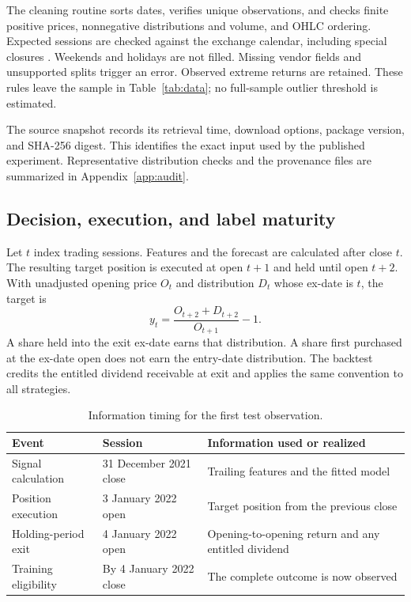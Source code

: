 The cleaning routine sorts dates, verifies unique observations, and checks finite positive prices, nonnegative distributions and volume, and OHLC ordering. Expected sessions are checked against the exchange calendar, including special closures \citep{exchangecalendars}. Weekends and holidays are not filled. Missing vendor fields and unsupported splits trigger an error. Observed extreme returns are retained. These rules leave the sample in Table~\ref{tab:data}; no full-sample outlier threshold is estimated.

The source snapshot records its retrieval time, download options, package version, and SHA-256 digest. This identifies the exact input used by the published experiment. Representative distribution checks and the provenance files are summarized in Appendix~\ref{app:audit}.

\subsection{Decision, execution, and label maturity}
Let $t$ index trading sessions. Features and the forecast are calculated after close $t$. The resulting target position is executed at open $t+1$ and held until open $t+2$. With unadjusted opening price $O_t$ and distribution $D_t$ whose ex-date is $t$, the target is
\begin{equation}
y_t=\frac{O_{t+2}+D_{t+2}}{O_{t+1}}-1.
\label{eq:target}
\end{equation}
A share held into the exit ex-date earns that distribution. A share first purchased at the ex-date open does not earn the entry-date distribution. The backtest credits the entitled dividend receivable at exit and applies the same convention to all strategies.

\begin{table}[!htbp]
\centering\small
\caption{Information timing for the first test observation.}
\label{tab:timing}
\begin{tabularx}{\textwidth}{@{}p{}p{}X@{}}
\toprule
Event & Session & Information used or realized \\
\midrule
Signal calculation & 31 December 2021 close & Trailing features and the fitted model \\
Position execution & 3 January 2022 open & Target position from the previous close \\
Holding-period exit & 4 January 2022 open & Opening-to-opening return and any entitled dividend \\
Training eligibility & By 4 January 2022 close & The complete outcome is now observed \\
\bottomrule
\end{tabularx}
\end{table}

